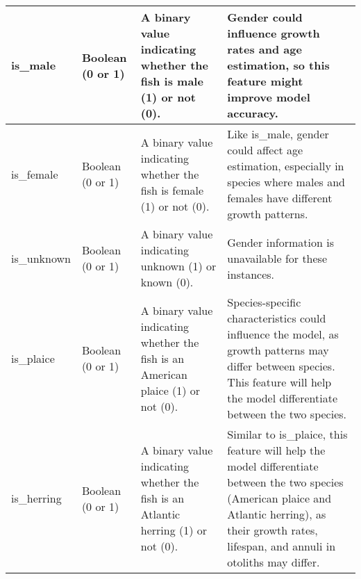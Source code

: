\begin{longtable}{| p{} | p{} | p{} | p{} |}
    \hline
    is\_male &
    Boolean (0 or 1) &
    A binary value indicating whether the fish is male (1) or not (0). &
    Gender could influence growth rates and age estimation, so this feature might improve model accuracy. \\
    \hline
    is\_female &
    Boolean (0 or 1) &
    A binary value indicating whether the fish is female (1) or not (0). &
    Like is\_male, gender could affect age estimation, especially in species where males and females have different growth patterns. \\
    \hline
    is\_unknown &
    Boolean (0 or 1) &
    A binary value indicating unknown (1) or known (0). &
    Gender information is unavailable for these instances. \\
    \hline
    is\_plaice &
    Boolean (0 or 1) &
    A binary value indicating whether the fish is an American plaice (1) or not (0). &
    Species-specific characteristics could influence the model, as growth patterns may differ between species.
    This feature will help the model differentiate between the two species. \\
    \hline
    is\_herring &
    Boolean (0 or 1) &
    A binary value indicating whether the fish is an Atlantic herring (1) or not (0). &
    Similar to is\_plaice, this feature will help the model differentiate between the two species (American plaice and Atlantic herring), as their growth rates, lifespan, and annuli in otoliths may differ. \\
    \hline


\end{longtable}
